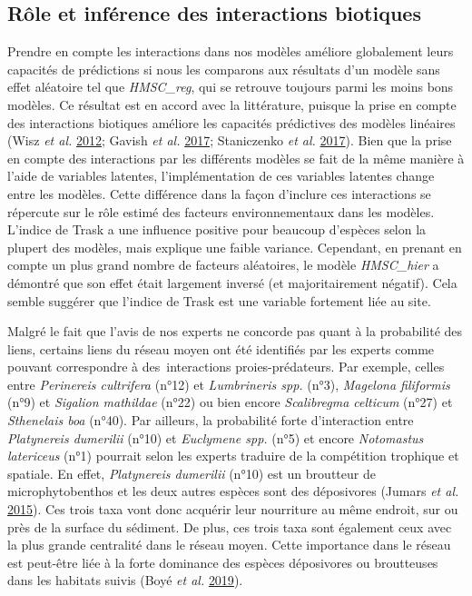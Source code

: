 \documentclass[12pt,]{article}
\begin{document}
\hypertarget{ruxf4le-et-infuxe9rence-des-interactions-biotiques}{%
\subsection{Rôle et inférence des interactions
biotiques}\label{ruxf4le-et-infuxe9rence-des-interactions-biotiques}}

Prendre en compte les interactions dans nos modèles améliore globalement
leurs capacités de prédictions si nous les comparons aux résultats d'un
modèle sans effet aléatoire tel que \emph{HMSC\_reg}, qui se retrouve
toujours parmi les moins bons modèles. Ce résultat est en accord avec la
littérature, puisque la prise en compte des interactions biotiques
améliore les capacités prédictives des modèles linéaires (Wisz \emph{et
al.} \protect\hyperlink{ref-Wisz_2012}{2012}; Gavish \emph{et al.}
\protect\hyperlink{ref-Gavish_2017}{2017}; Staniczenko \emph{et al.}
\protect\hyperlink{ref-Staniczenko_2017}{2017}). Bien que la prise en
compte des interactions par les différents modèles se fait de la même
manière à l'aide de variables latentes, l'implémentation de ces
variables latentes change entre les modèles. Cette différence dans la
façon d'inclure ces interactions se répercute sur le rôle estimé des
facteurs environnementaux dans les modèles. L'indice de Trask a une
influence positive pour beaucoup d'espèces selon la plupert des modèles,
mais explique une faible variance. Cependant, en prenant en compte un
plus grand nombre de facteurs aléatoires, le modèle \emph{HMSC\_hier} a
démontré que son effet était largement inversé (et majoritairement
négatif). Cela semble suggérer que l'indice de Trask est une variable
fortement liée au site.

Malgré le fait que l'avis de nos experts ne concorde pas quant à la
probabilité des liens, certains liens du réseau moyen ont été identifiés
par les experts comme pouvant correspondre à des~interactions
proies-prédateurs. Par exemple, celles entre \emph{Perinereis
cultrifera} (n°12) et \emph{Lumbrineris spp.} (n°3), \emph{Magelona
filiformis} (n°9) et \emph{Sigalion mathildae} (n°22) ou bien encore
\emph{Scalibregma celticum} (n°27) et \emph{Sthenelais boa} (n°40). Par
ailleurs, la probabilité forte d'interaction entre \emph{Platynereis
dumerilii} (n°10) et \emph{Euclymene spp.} (n°5) et encore
\emph{Notomastus latericeus} (n°1) pourrait selon les experts traduire
de la compétition trophique et spatiale. En effet, \emph{Platynereis
dumerilii} (n°10) est un broutteur de microphytobenthos et les deux
autres espèces sont des déposivores (Jumars \emph{et al.}
\protect\hyperlink{ref-Jumars_2015}{2015}). Ces trois taxa vont donc
acquérir leur nourriture au même endroit, sur ou près de la surface du
sédiment. De plus, ces trois taxa sont également ceux avec la plus
grande centralité dans le réseau moyen. Cette importance dans le réseau
est peut-être liée à la forte dominance des espèces déposivores ou
broutteuses dans les habitats suivis (Boyé \emph{et al.}
\protect\hyperlink{ref-Boye_2019a}{2019}).
\end{document}
